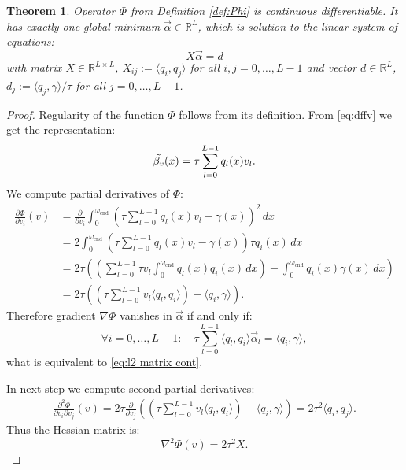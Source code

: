 \documentclass[a4paper,11pt,bibliography=totoc,listof=totoc,headinclude=true,cleardoublepage=empty,oneside]{scrbook}
\newtheorem{theorem}{Theorem}[chapter]
\newcommand{\R}{\mathbb{R}}
\newcommand{\e}{\mathrm{end}}
\begin{document}
\begin{theorem}
    Operator $\Phi$ from Definition \ref{def:Phi} is continuous differentiable. It has exactly one global minimum $\Vec{\alpha} \in \R^L$, which is solution to the linear system of equations:
    \begin{equation}\label{eq:l2 matrix cont}
        X \Vec{\alpha} = d
    \end{equation}
    with matrix $X\in \R^{L\times L}$, $X_{ij} := \langle q_i, q_j \rangle$ for all $i, j = 0, \dots, L-1$ and vector $d \in \R^L$, $d_j := \langle q_j, \gamma\rangle/\tau$ for all $j = 0, \dots, L-1$.
\end{theorem}
\begin{proof}
    Regularity of the function $\Phi$ follows from its definition. From \eqref{eq:dffv} we get the representation: 
    \begin{equation*}
        \Tilde{\beta_v} (x) = \tau \sum_{l=0}^{L-1} q_l(x) v_l.
    \end{equation*}
    We compute partial derivatives of $\Phi$:
    \begin{align*}
        \frac{\partial \Phi}{\partial v_i}(v) &= \frac{\partial}{\partial v_i} \int_0^{\omega_\e} \left(\tau \sum_{l=0}^{L-1} q_l(x) v_l - \gamma(x) \right)^2 \, dx \\ &= 2 \int_0^{\omega_\e} \left(\tau \sum_{l=0}^{L-1} q_l(x) v_l - \gamma(x) \right)\tau q_i(x) \, dx \\ &= 2 \tau \left(\left(\sum_{l=0}^{L-1} \tau v_l \int_0^{\omega_\e} q_l(x) q_i(x) \, dx \right) - \int_0^{\omega_\e} q_i(x)\gamma(x) \, dx \right) \\ &= 2\tau \left( \left( \tau\sum_{l=0}^{L-1} v_l \langle q_l, q_i\rangle \right) - \langle q_i, \gamma\rangle \right).
    \end{align*}
    Therefore gradient $\nabla\Phi$ vanishes in $\Vec{\alpha}$ if and only if:
    \begin{equation*}
        \forall i = 0, \dots, L-1: \quad  \tau\sum_{l=0}^{L-1} \langle q_l, q_i\rangle \Vec{\alpha}_l = \langle q_i, \gamma \rangle,
    \end{equation*}
    what is equivalent to \eqref{eq:l2 matrix cont}.
    
 In next step we compute second partial derivatives:
    \begin{align*}
        \frac{\partial^2 \Phi}{\partial v_i \partial v_j}(v) = 2\tau \frac{\partial}{\partial v_j }  \left( \left( \tau\sum_{l=0}^{L-1} v_l \langle q_l, q_i\rangle \right) - \langle q_i, \gamma\rangle \right) = 2\tau^2 \langle q_i, q_j \rangle.
    \end{align*}
    Thus the Hessian matrix is:
    \begin{equation*}
        \nabla^2 \Phi(v) = 2 \tau^2 X.
    \end{equation*}
    

\end{proof}
\end{document}
